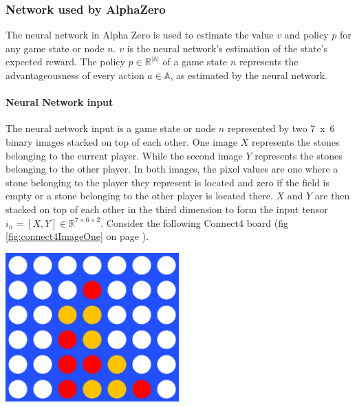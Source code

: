 \documentclass[12pt]{article}
\newcommand{\imgRef}[1]{(fig \ref{#1} on page \pageref{#1})}
\begin{document}
\subsubsection{Network used by AlphaZero}
The neural network in Alpha Zero is used to estimate the value \(v\) and policy \(p\) for any game state or node \(n\). \(v\) is the neural network's estimation of the state's expected reward. The policy \(p \in\mathbb{R}^{|\mathbb{A}|}\) of a game state \(n\) represents the advantageousness of every action \(a\in\mathbb{A}\), as estimated by the neural network.
\paragraph{Neural Network input}\label{sec:neuralNetworkInput}
The neural network input is a game state or node \(n\) represented by two \mbox{7 x 6} binary images stacked on top of each other. One image \(X\) represents the stones belonging to the current player. While the second image \(Y\) represents the stones belonging to the other player. In both images, the pixel values are one where a stone belonging to the player they represent is located and zero if the field is empty or a stone belonging to the other player is located there. \(X\) and \(Y\) are then stacked on top of each other in the third dimension to form the input tensor \(i_n = [X, Y] \in \mathbb{R}^{7 \times 6 \times 2}\).
Consider the following Connect4 board \imgRef{fig:connect4ImageOne}.

\begin{center}
\includegraphics[width=0.5\textwidth]{connectFourExample}
\label{fig:connect4ImageOne}
\end{center}
\end{document}
